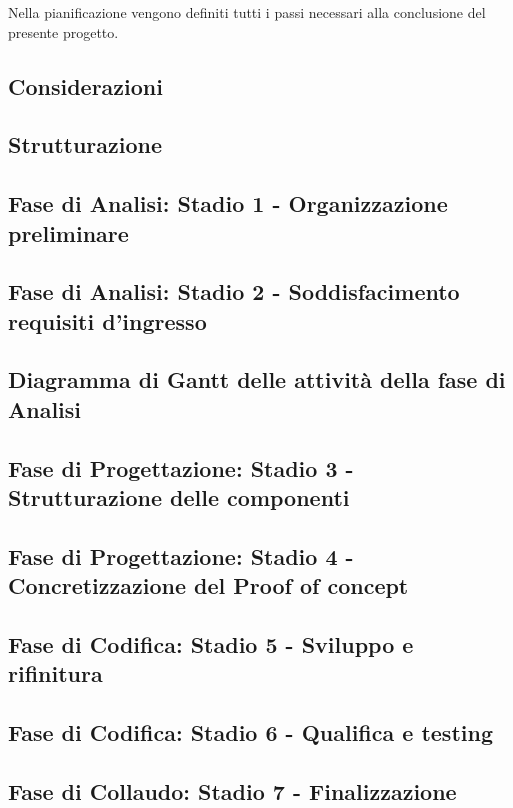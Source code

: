 Nella pianificazione vengono definiti tutti i passi necessari alla conclusione del presente progetto.

\subsection{Considerazioni}\label{sec:Considerazioni}


\subsection{Strutturazione}\label{sec:Strutturazione}


\subsection{Fase di Analisi: Stadio 1 - Organizzazione preliminare}\label{sec:Stadio1}


\subsection{Fase di Analisi: Stadio 2 - Soddisfacimento requisiti d'ingresso}\label{sec:Stadio2}


\newpage
\subsection{Diagramma di Gantt delle attività della fase di Analisi}\label{sec:Stadio2}

    
\subsection{Fase di Progettazione: Stadio 3 - Strutturazione delle componenti}\label{sec:Stadio3}

    
\subsection{Fase di Progettazione: Stadio 4 - Concretizzazione del Proof of concept}\label{sec:Stadio4}

    
\subsection{Fase di Codifica: Stadio 5 - Sviluppo e rifinitura }\label{sec:Stadio5}

    
\subsection{Fase di Codifica: Stadio 6 - Qualifica e testing}\label{sec:Stadio6}

    
\subsection{Fase di Collaudo: Stadio 7 - Finalizzazione}\label{sec:Stadio7}
